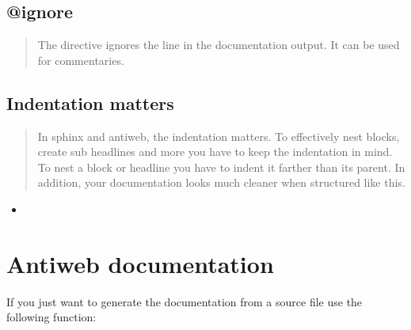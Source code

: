 \documentclass[letterpaper,10pt,english]{sphinxmanual}
\begin{document}
\section{@ignore}
\label{getting_started:ignore}\begin{quote}

The  directive ignores the line in the
documentation output. It can be used for commentaries.
\end{quote}


\section{Indentation matters}
\label{getting_started:indentation-matters}\begin{quote}

In sphinx and antiweb, the indentation matters. To effectively nest blocks, create sub headlines and more you have to keep the indentation in mind. To nest a block or headline you have to indent it farther than its parent. In addition, your documentation looks much cleaner when structured like this.
\end{quote}
\begin{itemize}
\item {} 

\end{itemize}


\chapter{Antiweb documentation}
\label{antiweb:antiweb-documentation}\label{antiweb::doc}
If you just want to generate the documentation from a source file use
the following function:
\end{document}
